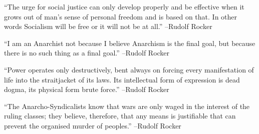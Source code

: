 \documentclass{article}%
\begin{document}
\begin{minipage}{\textwidth}%
\flushleft%
“The urge for social justice can only develop properly and be effective when it grows out of man's sense of personal freedom and is based on that. In other words Socialism will be free or it will not be at all.”%
\linebreak%
\vspace{1mm}%
–Rudolf Rocker%
\linebreak%
\vspace{1mm}%
\end{minipage}%
\linebreak%
\vspace{1mm}%
\begin{minipage}{\textwidth}%
\flushleft%
“I am an Anarchist not because I believe Anarchism is the final goal, but because there is no such thing as a final goal.”%
\linebreak%
\vspace{1mm}%
–Rudolf Rocker%
\linebreak%
\vspace{1mm}%
\end{minipage}%
\linebreak%
\vspace{1mm}%
\begin{minipage}{\textwidth}%
\flushleft%
“Power operates only destructively, bent always on forcing every manifestation of life into the straitjacket of its laws. Its intellectual form of expression is dead dogma, its physical form brute force.”%
\linebreak%
\vspace{1mm}%
–Rudolf Rocker%
\linebreak%
\vspace{1mm}%
\end{minipage}%
\linebreak%
\vspace{1mm}%
\begin{minipage}{\textwidth}%
\flushleft%
“The Anarcho{-}Syndicalists know that wars are only waged in the interest of the ruling classes; they believe, therefore, that any means is justifiable that can prevent the organised murder of peoples.”%
\linebreak%
\vspace{1mm}%
–Rudolf Rocker%
\linebreak%
\vspace{1mm}%
\end{minipage}%
\linebreak%
\vspace{1mm}%
\end{document}
